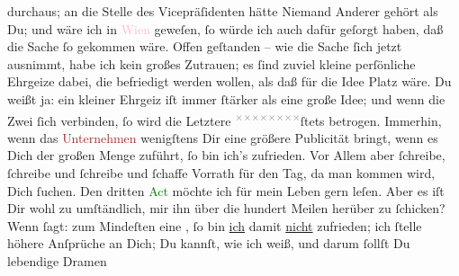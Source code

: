 \documentclass[twoside=false,titlepage=false,open=any, parskip=never, fontsize=12pt, headings=small, chapterprefix=false, appendixprefix=false]{scrbook}
\newcommand{\Theight}{\dimexpr\fontcharht\font`W}
\newcommand{\pbposition}{\depth}
\newcommand{\pb}{\nobreak\hspace{0pt}\raisebox{-0.1em}{\raisebox{\pbposition}{\textnormal{|}}}\nobreak\hspace{0pt}}
\newcommand{\substVorne}{\textnormal{\raisebox{\Theight}{\raisebox{-\height}{\rotatebox[origin=c]{180}{v}\normalsize}}}}
\newcommand{\substDazwischen}{}
\newcommand{\substHinten}{\textnormal{\raisebox{\Theight}{\raisebox{-\height}{\small{v}\normalsize}}}}
\begin{document}
               durchaus; an die Stelle des Vicepräſidenten hätte Niemand Anderer gehört als Du; und
               wäre ich in \textcolor{pink}{Wien}{}\ledrightnote{\textcolor{pink}{Wien}} geweſen, ſo würde ich auch dafür
               geſorgt haben, daß die Sache {\pb}ſo gekommen wäre.
               Offen geſtanden – wie die Sache ſich jetzt ausnimmt, habe ich kein großes Zutrauen;
               es ſind zuviel kleine perſönliche Ehrgeize dabei, die befriedigt werden wollen, als
               daß für die Idee Platz wäre. Du weißt ja: ein kleiner Ehrgeiz iſt immer ſtärker als
               eine große Idee; und wenn die Zwei ſich verbinden, ſo wird die Letztere \substVorne{}\textsuperscript{\textcolor{gray}{×}\-\textcolor{gray}{×}\-\textcolor{gray}{×}\-\textcolor{gray}{×}\-\textcolor{gray}{×}\-\textcolor{gray}{×}\-\textcolor{gray}{×}\-\textcolor{gray}{×}}\substDazwischen{}ſtets\substHinten{} betrogen. Immerhin, wenn das \textcolor{brown}{Unternehmen}{} wenigſtens Dir eine größere Publicität bringt,
               wenn es Dich der großen Menge zuführt, ſo bin ich’s zufrieden. Vor Allem aber
               ſchreibe, ſchreibe und ſchreibe und ſchaffe Vorrath für den Tag, da man kommen wird,
               Dich ſuchen. Den dritten \textcolor{green}{Act}{} möchte ich für mein Leben gern leſen. Aber es iſt Dir
               wohl zu umſtändlich, mir ihn über die hundert Meilen herüber zu ſchicken? Wenn \textsc{\label{K_L02668-33v}\label{K_L02668-33h}} ſagt: zum Mindeſten eine \label{K_L02668-8v}\label{K_L02668-8h}, ſo bin \uline{ich} damit \uline{nicht} zufrieden; ich ſtelle höhere Anſprüche an Dich; Du kannſt, wie ich
               weiß, und darum ſollſt Du {\pb}lebendige Dramen
\end{document}
